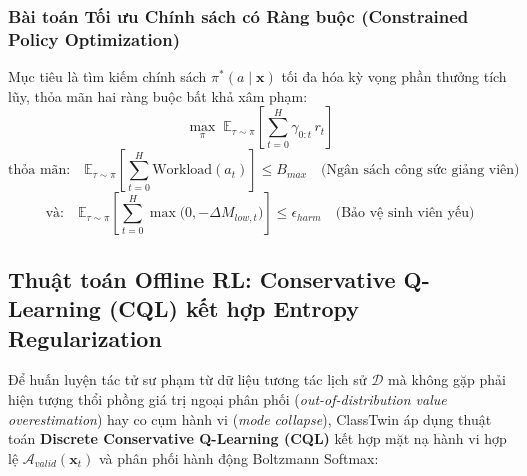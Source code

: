 \subsubsection{Bài toán Tối ưu Chính sách có Ràng buộc (Constrained Policy Optimization)}
Mục tiêu là tìm kiếm chính sách $\pi^*(a \mid \mathbf{x})$ tối đa hóa kỳ vọng phần thưởng tích lũy, thỏa mãn hai ràng buộc bất khả xâm phạm:
\begin{equation}\label{eq:constrained-objective}
  \max_{\pi} \; \mathbb{E}_{\tau \sim \pi} \left[ \sum_{t=0}^{H} \gamma_{0:t} \, r_t \right]
\end{equation}
\begin{equation}\label{eq:constraint-workload}
  \text{thỏa mãn:} \quad \mathbb{E}_{\tau \sim \pi} \left[ \sum_{t=0}^{H} \text{Workload}(a_t) \right] \le B_{max} \quad \text{(Ngân sách công sức giảng viên)}
\end{equation}
\begin{equation}\label{eq:constraint-fairness}
  \text{và:} \quad \mathbb{E}_{\tau \sim \pi} \left[ \sum_{t=0}^{H} \max\big(0, -\Delta M_{low, t}\big) \right] \le \epsilon_{harm} \quad \text{(Bảo vệ sinh viên yếu)}
\end{equation}

\subsection{Thuật toán Offline RL: Conservative Q-Learning (CQL) kết hợp Entropy Regularization}\label{subsec:cql}
Để huấn luyện tác tử sư phạm từ dữ liệu tương tác lịch sử $\mathcal{D}$ mà không gặp phải hiện tượng thổi phồng giá trị ngoại phân phối (\textit{out-of-distribution value overestimation}) hay co cụm hành vi (\textit{mode collapse}), ClassTwin áp dụng thuật toán \textbf{Discrete Conservative Q-Learning (CQL)} kết hợp mặt nạ hành vi hợp lệ $\mathcal{A}_{valid}(\mathbf{x}_t)$ và phân phối hành động Boltzmann Softmax:

